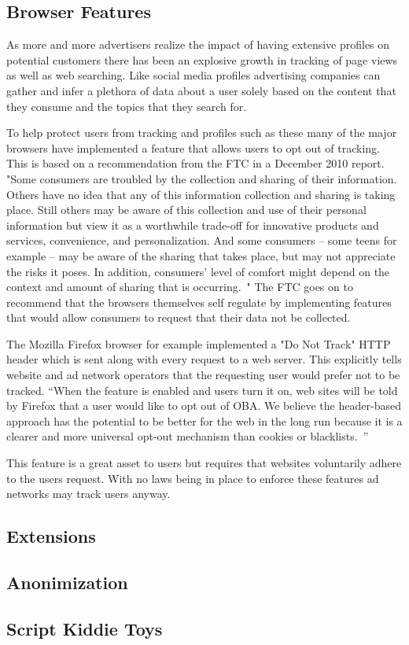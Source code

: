 
\subsection{Browser Features}
As more and more advertisers realize the impact of having extensive profiles on
potential customers there has been an explosive growth in tracking of page views
as well as web searching. Like social media profiles advertising companies can
gather and infer a plethora of data about a user solely based on the content
that they consume and the topics that they search for. 

To help protect users from tracking and profiles such as these many of the major
browsers have implemented a feature that allows users to opt out of tracking.
This is based on a recommendation from the FTC in a December 2010 report. "Some
consumers are troubled by the collection and sharing of their information.
Others have no idea that any of this information collection and sharing is
taking place. Still others may be aware of this collection and use of their
personal information but view it as a worthwhile trade-off for innovative
products and services, convenience, and personalization. And some consumers –
some teens for example – may be aware of the sharing that takes place, but may
not appreciate the risks it poses. In addition, consumers’ level of comfort
might depend on the context and amount of sharing that is occurring.~\cite{ftc}"
The FTC goes on to recommend that the browsers themselves self regulate by
implementing features that would allow consumers to request that their data not
be collected.

The Mozilla Firefox browser for example implemented a "Do Not Track" HTTP header
which is sent along with every request to a web server. This explicitly tells
website and ad network operators that the requesting user would prefer not to be
tracked. “When the feature is enabled and users turn it on, web sites will be
told by Firefox that a user would like to opt out of OBA. We believe the
header-based approach has the potential to be better for the web in the long run
because it is a clearer and more universal opt-out mechanism than cookies or
blacklists.~\cite{fpc}”

This feature is a great asset to users but requires that websites voluntarily
adhere to the users request. With no laws being in place to enforce these
features ad networks may track users anyway.

\subsection{Extensions} 





\subsection{Anonimization} 




\subsection{Script Kiddie Toys}

